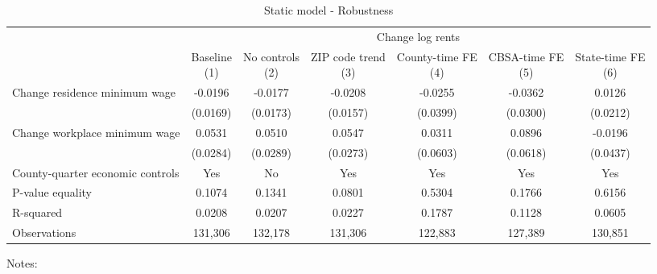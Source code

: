 \begin{table}
    \caption{Static model - Robustness}
    \label{tab:static_robust}
    \centering

    \begin{tabular}{@{}lcccccc@{}}
        \toprule
                                                  & \multicolumn{6}{c}{Change log rents}                                          \\ \cmidrule(l){2-7}
                                                  & \shortstack{Baseline\\(1)}       & \shortstack{No controls\\(2)} & \shortstack{ZIP code trend\\(3)} 
                                                  & \shortstack{County-time FE\\(4)} & \shortstack{CBSA-time FE\\(5)} & \shortstack{State-time FE\\(6)} \\ \midrule
        Change residence minimum wage             & -0.0196      & -0.0177         & -0.0208       & -0.0255        & -0.0362       & 0.0126             \\
                                                  & (0.0169)    & (0.0173)       & (0.0157)     & (0.0399)      & (0.0300)     & (0.0212)           \\
        Change workplace minimum wage             & 0.0531      & 0.0510         & 0.0547       & 0.0311        & 0.0896       & -0.0196             \\
                                                  & (0.0284)    & (0.0289)       & (0.0273)     & (0.0603)      & (0.0618)     & (0.0437)           \\  \midrule
        County-quarter economic controls               & Yes      &  No         & Yes       & Yes        & Yes       & Yes             \\
        P-value equality                          & 0.1074      & 0.1341         & 0.0801       & 0.5304        & 0.1766       & 0.6156             \\
        R-squared                                 & 0.0208      & 0.0207         & 0.0227       & 0.1787        & 0.1128       & 0.0605             \\
        Observations                              & 131,306     & 132,178        & 131,306      & 122,883       & 127,389      & 130,851            \\ \bottomrule
    \end{tabular}

    \begin{minipage}{.95\textwidth} \footnotesize
        \vspace{2mm}
        Notes: 
    \end{minipage}
\end{table}
